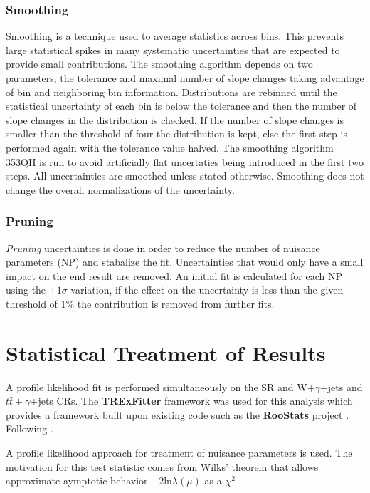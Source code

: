 \subsubsection{Smoothing}
Smoothing is a technique used to average statistics across bins.  This prevents large statistical spikes in many systematic uncertainties that are expected to provide small contributions.  The smoothing algorithm depends on two parameters, the tolerance and maximal number of slope changes taking advantage of bin and neighboring bin information.  Distributions are rebinned until the statistical uncertainty of each bin is below the tolerance and then the number of slope changes in the distribution is checked.  If the number of slope changes is smaller than the threshold of four the distribution is kept, else the first step is performed again with the tolerance value halved.  The smoothing algorithm 353QH \cite{Friedman:695770} is run to avoid artificially flat uncertaties being introduced in the first two steps.  All uncertainties are smoothed unless stated otherwise.  Smoothing does not change the overall normalizations of the uncertainty.

\subsubsection{Pruning}
\textit{Pruning} uncertainties is done in order to reduce the number of nuisance parameters (NP) and stabalize the fit.  Uncertainties that would only have a small impact on the end result are removed.  An initial fit is calculated for each NP using the $\pm 1 \sigma$ variation, if the effect on the uncertainty is less than the given threshold of 1\% the contribution is removed from further fits. %

\section{Statistical Treatment of Results}
A profile likelihood fit is performed simultaneously on the SR and W+$\gamma$+jets and $t\bar{t} +\gamma$+jets CRs.  The \textbf{TRExFitter} framework \cite{TRExFitter} was used for this analysis which provides a framework built upon existing code such as the \textbf{RooStats} project \cite{Moneta:2010pm}.
Following \cite{Lista:2016chp}.

A profile likelihood approach for treatment of nuisance parameters \cite{Cowan:2010js} is used. The motivation for this test statistic comes from Wilks' theorem that allows approximate aymptotic behavior $-2 \text{ln} \lambda(\mu)$ as a $\chi^2$ \cite{Wilks:1938dza}.

